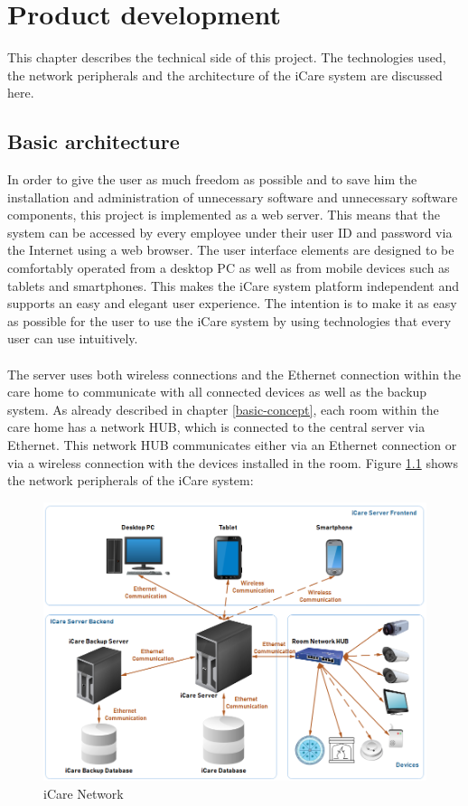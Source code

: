 \chapter{Product development}
This chapter describes the technical side of this project. The technologies used, the network peripherals and the architecture of the iCare system are discussed here.
\section{Basic architecture}
In order to give the user as much freedom as possible and to save him the installation and administration of unnecessary software and unnecessary software components, this project is implemented as a web server. This means that the system can be accessed by every employee under their user ID and password via the Internet using a web browser. The user interface elements are designed to be comfortably operated from a desktop PC as well as from mobile devices such as tablets and smartphones. This makes the iCare system platform independent and supports an easy and elegant user experience. The intention is to make it as easy as possible for the user to use the iCare system by using technologies that every user can use intuitively.\\\\
The server uses both wireless connections and the Ethernet connection within the care home to communicate with all connected devices as well as the backup system. As already described in chapter \ref{basic-concept}, each room within the care home has a network HUB, which is connected to the central server via Ethernet. This network HUB communicates either via an Ethernet connection or via a wireless connection with the devices installed in the room. Figure \ref{icare-network} shows the network peripherals of the iCare system:
\begin{figure}[H]
	\centering
	\includegraphics[width =1.0\textwidth]{images/iCare-Network.PNG}
	\caption{iCare Network}
	\label{icare-network}
\end{figure}
